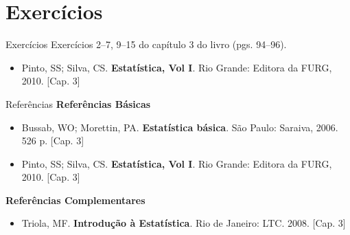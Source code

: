 \documentclass[10pt]{beamer}\usepackage[]{graphicx}\usepackage[]{color}
\theoremstyle{definition}
\begin{document}
\section{Exercícios}

\begin{frame}[fragile]{Exercícios}
  Exercícios 2--7, 9--15 do capítulo 3 do livro (pgs. 94--96).
  \vspace{1em}
  \begin{itemize}
  \item[] Pinto, SS; Silva, CS. \textbf{Estatística, Vol I}. Rio Grande:
    Editora da FURG, 2010. [Cap. 3]
  \end{itemize}
\end{frame}

\begin{frame}{Referências}
  \textbf{Referências Básicas}
  \begin{itemize}
  \item Bussab, WO; Morettin, PA. \textbf{Estatística básica}. São
    Paulo: Saraiva, 2006. 526 p. [Cap. 3]
  \item Pinto, SS; Silva, CS. \textbf{Estatística, Vol I}. Rio Grande:
    Editora da FURG, 2010. [Cap. 3]
  \end{itemize}
  \textbf{Referências Complementares}
  \begin{itemize}
      \item Triola, MF. \textbf{Introdução à Estatística}. Rio de Janeiro:
    LTC. 2008. [Cap. 3]
  \end{itemize}
\end{frame}
\end{document}
